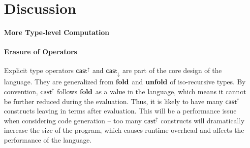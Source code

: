 \newcommand{\framedhslinecorrect}[2]%
  {#1[#2]}

\newcommand{\framedhs}{\sethscode{framedhscode}}


\newenvironment{inlinehscode}%
  {\(\def\column##1##2{}%
   \let\>\undefined\let\<\undefined\let\\\undefined
   \newcommand\>[1][]{}\newcommand\<[1][]{}\newcommand\\[1][]{}%
   \def\fromto##1##2##3{##3}%
   \def\nextline{}}{\) }%

\newcommand{\inlinehs}{\sethscode{inlinehscode}}


\newenvironment{joincode}%
  {\let\orighscode=\hscode
   \let\origendhscode=\endhscode
   \def\endhscode{\def\hscode{\endgroup\def\@currenvir{hscode}\\}\begingroup}
   \orighscode\def\hscode{\endgroup\def\@currenvir{hscode}}}%
  {\origendhscode
   \global\let\hscode=\orighscode
   \global\let\endhscode=\origendhscode}%

\makeatother
\EndFmtInput
%

\section{Discussion}
\paragraph{More Type-level Computation}


\paragraph{Erasure of \cast Operators}

Explicit type \cast operators $ \mathsf{cast}^{\uparrow} $ and $ \mathsf{cast}_{\downarrow} $ are part of the core design of the language. They are generalized from $\mathbf{fold}$ and $\mathbf{unfold}$ of iso-recursive types. By convention, $ \mathsf{cast}^{\uparrow} $ follows $\mathbf{fold}$ as a value in the language, which means it cannot be further reduced during the evaluation. Thus, it is likely to have many $ \mathsf{cast}^{\uparrow} $ constructs leaving in terms after evaluation. This will be a performance issue when considering code generation -- too many $ \mathsf{cast}^{\uparrow} $ constructs will dramatically increase the size of the program, which causes runtime overhead and affects the performance of the language.


